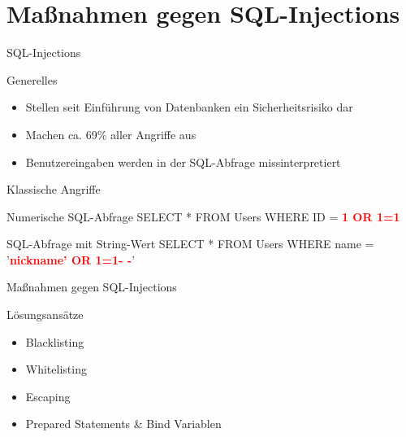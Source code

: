 \section{Maßnahmen gegen SQL-Injections}

\begin{frame}{SQL-Injections}
\begin{block}{Generelles}
\begin{itemize}
	\item Stellen seit Einführung von Datenbanken ein Sicherheitsrisiko dar
	\item Machen ca. 69\% aller Angriffe aus \footnotemark
	\item Benutzereingaben werden in der SQL-Abfrage missinterpretiert
\end{itemize}
\end{block}
\end{frame}

\begin{frame}{Klassische Angriffe}
\begin{block}{Numerische SQL-Abfrage}
	SELECT * FROM Users WHERE ID = \textcolor{red}{\textbf{1 OR 1=1}}
\end{block}
\begin{block}{SQL-Abfrage mit String-Wert}
	SELECT * FROM Users WHERE name = '{}\textcolor{red}{\textbf{nickname'{} OR 1=1- -}}'{}
\end{block}
\end{frame}


\begin{frame}{Maßnahmen gegen SQL-Injections}
\begin{block}{Lösungsansätze}
\begin{itemize}
\item Blacklisting 
\item Whitelisting
\item Escaping
\item Prepared Statements \& Bind Variablen
\end{itemize}
\end{block}
\end{frame}


